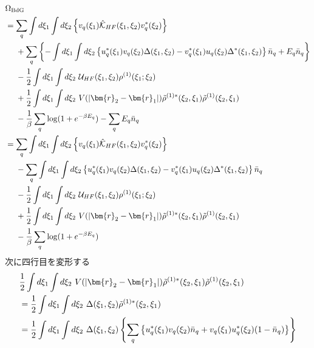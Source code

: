 \documentclass[dvipdfmx, 11pt, a4paper]{jsarticle}
\numberwithin{equation}{section}
\theoremstyle{definition}
\begin{document}
\begin{derivationBox}
        \begin{align}
            &\Omega_{\mathrm{BdG}}\notag \\
            &=\sum_q\int d\xi_1 \int d\xi_2 \left\{  v_q(\xi_1)\hat{\mathcal{K}}_{HF}(\xi_1,\xi_2)v_q^*(\xi_2) \right\}   \notag \\
            &\ \ \ \ +\sum_q\left\{ - \int d\xi_1 \int d\xi_2 \left\{    u_q^*(\xi_1) v_q(\xi_2)\Delta (\xi_1,\xi_2)   -    v^*_q(\xi_1)u_q(\xi_2)\Delta^* (\xi_1,\xi_2) \right\}\bar{n}_q +E_q\bar{n}_q \right\}   \notag \\
            &\ \ \ \ - \frac{1}{2}\int d\xi_1\int d\xi_2\ \mathcal{U}_{HF}(\xi_1,\xi_2)\rho^{(1)}(\xi_1;\xi_2) \notag \\
            &\ \ \ \ +\frac{1}{2}\int d\xi_1\int d\xi_2\ V(\left| \bm{r}_2-\bm{r}_1 \right|) \tilde{\rho}^{(1)*}(\xi_2,\xi_1) \tilde{\rho}^{(1)}(\xi_2,\xi_1) \notag \\
            &\ \ \ \ -\frac{1}{\beta} \sum_q \log (1 + e^{-\beta E_q}) - \sum_q E_q\bar{n}_q\notag \\
            &=\sum_q\int d\xi_1 \int d\xi_2 \left\{  v_q(\xi_1)\hat{\mathcal{K}}_{HF}(\xi_1,\xi_2)v_q^*(\xi_2) \right\}   \notag \\
            &\ \ \ \ -\sum_q  \int d\xi_1 \int d\xi_2 \left\{    u_q^*(\xi_1) v_q(\xi_2)\Delta (\xi_1,\xi_2)   -    v^*_q(\xi_1)u_q(\xi_2)\Delta^* (\xi_1,\xi_2) \right\}\bar{n}_q    \notag \\
            &\ \ \ \ - \frac{1}{2}\int d\xi_1\int d\xi_2\ \mathcal{U}_{HF}(\xi_1,\xi_2)\rho^{(1)}(\xi_1;\xi_2) \notag \\
            &\ \ \ \ +\frac{1}{2}\int d\xi_1\int d\xi_2\ V(\left| \bm{r}_2-\bm{r}_1 \right|) \tilde{\rho}^{(1)*}(\xi_2,\xi_1) \tilde{\rho}^{(1)}(\xi_2,\xi_1) \notag \\
            &\ \ \ \ -\frac{1}{\beta} \sum_q \log (1 + e^{-\beta E_q}) 
        \end{align}
        次に四行目を変形する
        \begin{align}
            &\frac{1}{2}\int d\xi_1\int d\xi_2\ V(\left| \bm{r}_2-\bm{r}_1 \right|) \tilde{\rho}^{(1)*}(\xi_2,\xi_1) \tilde{\rho}^{(1)}(\xi_2,\xi_1) \notag \\
            &= \frac{1}{2}\int d\xi_1\int d\xi_2\ \Delta(\xi_1,\xi_2)\tilde{\rho}^{(1)*}(\xi_2,\xi_1) \notag \\
            &= \frac{1}{2}\int d\xi_1\int d\xi_2\ \Delta(\xi_1,\xi_2)\left\{ \sum_q \left\{ u_q^*(\xi_1)v_q(\xi_2)\bar{n}_q +  v_q(\xi_1)u_q^*(\xi_2) (1-\bar{n}_q)\right\} \right\} \notag \\

\end{align}
\end{derivationBox}
\end{document}
